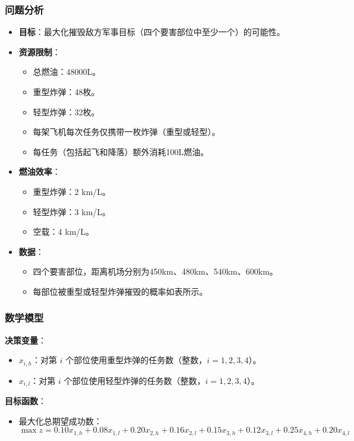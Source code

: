 \subsubsection{问题分析}
\begin{itemize}
    \item \textbf{目标}：最大化摧毁敌方军事目标（四个要害部位中至少一个）的可能性。
    \item \textbf{资源限制}：
        \begin{itemize}
            \item 总燃油：48000L。
            \item 重型炸弹：48枚。
            \item 轻型炸弹：32枚。
            \item 每架飞机每次任务仅携带一枚炸弹（重型或轻型）。
            \item 每任务（包括起飞和降落）额外消耗100L燃油。
        \end{itemize}
    \item \textbf{燃油效率}：
        \begin{itemize}
            \item 重型炸弹：2 km/L。
            \item 轻型炸弹：3 km/L。
            \item 空载：4 km/L。
        \end{itemize}
    \item \textbf{数据}：
        \begin{itemize}
            \item 四个要害部位，距离机场分别为450km、480km、540km、600km。
            \item 每部位被重型或轻型炸弹摧毁的概率如表所示。
        \end{itemize}
\end{itemize}

\subsubsection{数学模型}

\textbf{决策变量}：
\begin{itemize}
    \item \( x_{i,h} \)：对第 \( i \) 个部位使用重型炸弹的任务数（整数，\( i = 1,2,3,4 \)）。
    \item \( x_{i,l} \)：对第 \( i \) 个部位使用轻型炸弹的任务数（整数，\( i = 1,2,3,4 \)）。
\end{itemize}

\textbf{目标函数}：
\begin{itemize}
    \item 最大化总期望成功数：
    \[
    \max z = 0.10 x_{1,h} + 0.08 x_{1,l} + 0.20 x_{2,h} + 0.16 x_{2,l} + 0.15 x_{3,h} + 0.12 x_{3,l} + 0.25 x_{4,h} + 0.20 x_{4,l}
    \]
\end{itemize}

